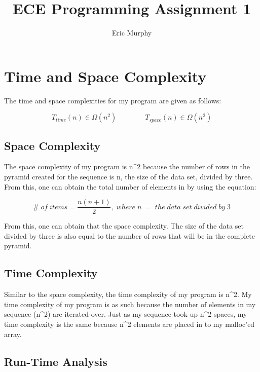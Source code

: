 \documentclass{article}
\begin{document}
\author{Eric Murphy\vspace{-2ex}}
\title{ECE Programming Assignment 1}

\maketitle

\section*{Time and Space Complexity}

\indent The time and space complexities for my program are given as follows:

\begin{equation*}
  T_{time}(n) \in \Omega (n^2) \qquad \qquad
  T_{space}(n) \in \Omega (n^2)
\end{equation*}

\subsection*{Space Complexity}

The space complexity of my program is n\^{}2 because the number of rows in the pyramid created for the sequence is n, the size of the data set, divided by three.
From this, one can obtain the total number of elements in by using the equation:

\begin{equation*}
  \# \; of \; items = \frac{n(n+1)}{2}, \; where \; n \; = \; the \; data \; set \; divided \; by \; 3
\end{equation*}

\noindent From this, one can obtain that the space complexity.  The size of the data set divided by three is also equal to the number of rows that will be in the complete pyramid.

\subsection*{Time Complexity}

Similar to the space complexity, the time complexity of my program is n\^{}2.  My time complexity of my program is as such because the number of elements in my sequence (n\^{}2) are iterated over.
Just as my sequence took up n\^{}2 spaces, my time complexity is the same because n\^{}2 elements are placed in to my malloc'ed array.

\subsection*{Run-Time Analysis}
\end{document}
